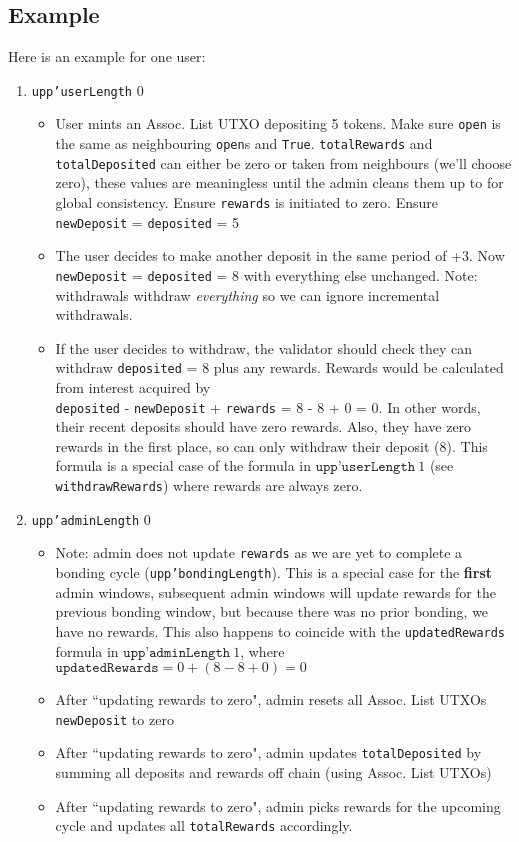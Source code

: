 \documentclass[10pt, a4paper]{article}
\theoremstyle{definition}
\begin{document}
\subsection{Example}\label{subsection:Example}
Here is an example for one user:
\begin{enumerate}
\item{\texttt{upp'userLength} 0
\begin{itemize}
\item{User mints an Assoc. List UTXO depositing 5 tokens. Make sure \texttt{open} is the same as neighbouring \texttt{open}s and \texttt{True}. \texttt{totalRewards} and \texttt{totalDeposited} can either be zero or taken from neighbours (we'll choose zero), these values are meaningless until the admin cleans them up to for global consistency. Ensure \texttt{rewards} is initiated to zero. Ensure \texttt{newDeposit} = \texttt{deposited} = 5}
\item{The user decides to make another deposit in the same period of +3. Now \texttt{newDeposit} = \texttt{deposited} = 8 with everything else unchanged. Note: withdrawals withdraw \textit{everything} so we can ignore incremental withdrawals.}
\item{If the user decides to withdraw, the validator should check they can withdraw \texttt{deposited} = 8 plus any rewards.  Rewards would be calculated from interest acquired by \\ \texttt{deposited} - \texttt{newDeposit} + \texttt{rewards} = 8 - 8 + 0 = 0. In other words, their recent deposits should have zero rewards. Also, they have zero rewards in the first place, so can only withdraw their deposit (8). This formula is a special case of the formula in $\texttt{upp'userLength}\ 1$ (see \texttt{withdrawRewards}) where rewards are always zero.}
\end{itemize}
}


\item{\texttt{upp'adminLength} 0
\begin{itemize}
\item{Note: admin does not update \texttt{rewards} as we are yet to complete a bonding cycle (\texttt{upp'bondingLength}). This is a special case for the \textbf{first} admin windows, subsequent admin windows will update rewards for the previous bonding window, but because there was no prior bonding, we have no rewards. This also happens to coincide with the \texttt{updatedRewards} formula in $\texttt{upp'adminLength}\ 1$, where $\texttt{updatedRewards} = 0 + (8 - 8 + 0) = 0$}
\item{After ``updating rewards to zero", admin resets  all Assoc. List UTXOs \texttt{newDeposit} to zero}
\item{After ``updating rewards to zero", admin updates \texttt{totalDeposited} by summing all deposits and rewards off chain (using Assoc. List UTXOs)}
\item{After ``updating rewards to zero", admin picks rewards for the upcoming cycle and updates all \texttt{totalRewards} accordingly.}


\end{itemize}}
\end{enumerate}
\end{document}
